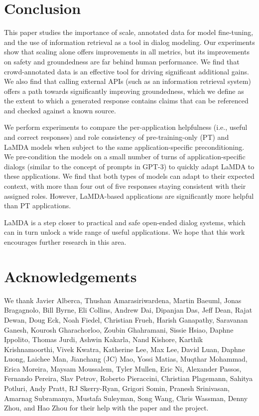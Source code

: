 \documentclass{article}
\begin{document}
\section{Conclusion}
This paper studies the importance of scale, annotated data for model fine-tuning, and the use of information retrieval as a tool in dialog modeling. Our experiments show that scaling alone offers improvements in all metrics, but its improvements on safety and groundedness are far behind human performance. We find that crowd-annotated data is an effective tool for driving significant additional gains. We also find that calling external APIs (such as an information retrieval system) offers a path towards significantly improving groundedness, which we define as the extent to which a generated response contains claims that can be referenced and checked against a known source.

We perform experiments to compare the per-application helpfulness (i.e., useful and correct responses) and role consistency of pre-training-only (PT) and LaMDA models when subject to the same application-specific preconditioning. We pre-condition the models on a small number of turns of application-specific dialogs (similar to the concept of prompts in GPT-3) to quickly adapt LaMDA to these applications. We find that both types of models can adapt to their expected context, with more than four out of five responses staying consistent with their assigned roles. However, LaMDA-based applications are significantly more helpful than PT applications.

LaMDA is a step closer to practical and safe open-ended dialog systems, which can in turn unlock a wide range of useful applications. We hope that this work encourages further research in this area.


\section*{Acknowledgements}
We thank Javier Alberca, Thushan Amarasiriwardena, Martin Baeuml, Jonas Bragagnolo, Bill Byrne,  Eli Collins, Andrew Dai, Dipanjan Das, Jeff Dean, Rajat Dewan, Doug Eck, Noah Fiedel, Christian Frueh,  Harish Ganapathy, Saravanan Ganesh, Kourosh Gharachorloo, Zoubin Ghahramani, Sissie Hsiao, Daphne Ippolito, Thomas Jurdi, Ashwin Kakarla, Nand Kishore, Karthik Krishnamoorthi, Vivek Kwatra, Katherine Lee, Max Lee, David Luan, Daphne Luong, Laichee Man, Jianchang (JC) Mao, Yossi Matias, Muqthar Mohammad, Erica Moreira, Maysam Moussalem, Tyler Mullen, Eric Ni, Alexander Passos, Fernando Pereira, Slav Petrov, Roberto Pieraccini, Christian Plagemann, Sahitya Potluri, Andy Pratt, RJ Skerry-Ryan, Grigori Somin, Pranesh Srinivasan, Amarnag Subramanya, Mustafa Suleyman, Song Wang, Chris Wassman, Denny Zhou, and Hao Zhou for their help with the paper and the project.
\end{document}
